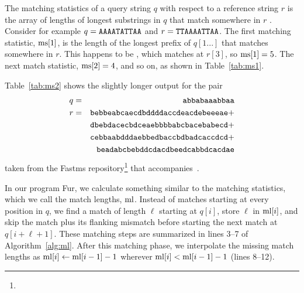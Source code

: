 The matching statistics of a query string $q$ with respect to a
reference string $r$ is the array of lengths of longest substrings in
$q$ that match somewhere in $r$ \cite[p. 132ff]{gus97:alg}. Consider
for example $q=\ty{AAAATATTAA}$ and $r=\ty{TTAAAATTAA}$. The first
matching statistic, $\mathrm{ms}[1]$, is the length of the longest prefix of
$q[1...]$ that matches somewhere in $r$. This happens to
be , which matches at $r[3]$, so $\mathrm{ms}[1]=5$. The next match
statistic, $\mathrm{ms}[2]=4$, and so on, as shown in Table~\ref{tab:ms1}.

\begin{table}
  \caption{Matching statistics, $\ms$, and match lengths,
    $\ml$, of the query $q=\ty{AAAATATTAA}$ with respect to the
    reference $r=\ty{TTAAAATTAA}$.}\label{tab:ms1}
  \begin{center}
    
  \end{center}
\end{table}

Table~\ref{tab:ms2} shows the slightly longer output for the pair
\begin{eqnarray}\label{eq:ms}
q & = &\texttt{abbabaaabbaa}\nonumber\\
r & = & \texttt{bebbeabcaecdbddddaccdeacdebeeeae} +\nonumber\\
  &   & \texttt{dbebdacecbdceaebbbbabcbacebabecd} +\\
  &   & \texttt{cebbaabdddaebbedbaccbdbadcaccdcd} +\nonumber\\
  &   & \texttt{beadabcbebddcdacdbeedcabbdcacdae}\nonumber
\end{eqnarray}
taken from the Fastms repository\footnote{} that accompanies~\cite{cun22:fas}.

\begin{table}
\caption{Matching statistics, $\ms$, and match lengths,
$\ml$, for the sequences in
equation~(\ref{eq:ms}).}\label{tab:ms2}
\begin{center}

\end{center}
\end{table}

In our program Fur, we calculate something similar to the matching
statistics, which we call the match lengths, $\ml$. Instead of matches
starting at every position in $q$, we find a match of length $\ell$
starting at $q[i]$, store $\ell$ in $\mathrm{ml}[i]$, and skip the match plus
its flanking mismatch before starting the next match at
$q[i+\ell+1]$. These matching steps are summarized in lines 3--7 of
Algorithm~\ref{alg:ml}. After this matching phase, we interpolate the
missing match lengths as $\mathrm{ml}[i]\leftarrow \mathrm{ml}[i-1]-1$ wherever
$\mathrm{ml}[i] < \mathrm{ml}[i-1]-1$ (lines 8--12).

